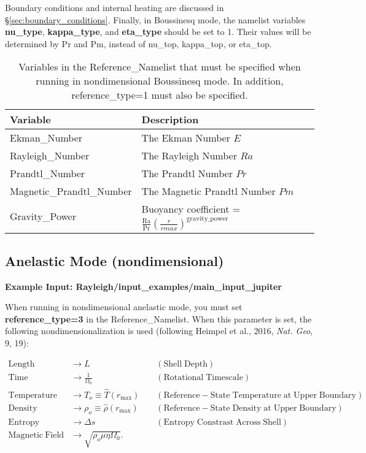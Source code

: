 Boundary conditions and internal heating are discussed in \S \ref{sec:boundary_conditions}.   Finally, in Boussinesq mode, the namelist variables \textbf{nu\_type}, \textbf{kappa\_type}, and \textbf{eta\_type} should be set to 1.   Their values will be determined by Pr and Pm, instead of nu\_top, kappa\_top, or eta\_top.
\begin{table}
\centering
\begin{tabular}{| l | l |}
\hline
Variable & Description \\
\hline
Ekman\_Number                  & The Ekman Number $E$ \\
Rayleigh\_Number               & The Rayleigh Number $Ra$ \\
Prandtl\_Number               & The Prandtl Number $Pr$ \\
Magnetic\_Prandtl\_Number             & The Magnetic Prandtl Number $Pm$ \\
Gravity\_Power & Buoyancy coefficient = $\frac{\mathrm{Ra}}{\mathrm{Pr}}\left(\frac{r}{rmax} \right)^\mathrm{gravity\_power}$ \\
\hline
\end{tabular}
\caption{\label{table:boussinesq} Variables in the Reference\_Namelist that must be specified when running in nondimensional Boussinesq mode. In addition, reference\_type=1 must also be specified.}
\end{table}



\clearpage
\subsection{Anelastic Mode (nondimensional)}

\textbf{Example Input:  Rayleigh/input\_examples/main\_input\_jupiter}


When running in nondimensional anelastic mode, you must set \textbf{reference\_type=3} in the Reference\_Namelist.  When this parameter is set, the following nondimensionalization is used (following Heimpel et al., 2016, \textit{Nat. Geo}, 9, 19):

\begin{align*}
\mathrm{Length} &\rightarrow L &\;\;\;\; \mathrm{(Shell\; Depth)} \\
\mathrm{Time} &\rightarrow   \frac{1}{\Omega_0} &\;\;\;\; \mathrm{(Rotational\; Timescale)}\\
\mathrm{Temperature} &\rightarrow T_o\equiv\hat{T}(r_\mathrm{max})&\;\;\;\; \mathrm{(Reference-State\; Temperature\; at\; Upper\; Boundary)} \\
\mathrm{Density} &\rightarrow \rho_o\equiv\hat{\rho}(r_\mathrm{max})&\;\;\;\; \mathrm{(Reference-State\; Density\; at\; Upper\; Boundary)} \\
\mathrm{Entropy} &\rightarrow \Delta{s}&\;\;\;\; \mathrm{(Entropy\; Constrast\; Across\; Shell)} \\
\mathrm{Magnetic~Field} &\rightarrow \sqrt{\rho_o\mu\eta\Omega_0}.
\end{align*}


